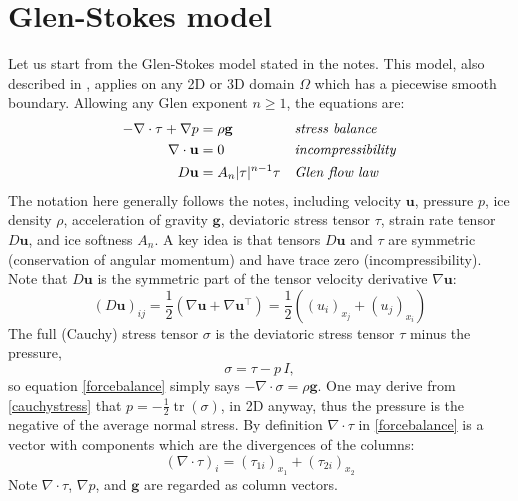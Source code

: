 \documentclass[letterpaper,final,12pt,reqno]{amsart}
\newcommand{\grad}{\nabla}
\newcommand{\Div}{\nabla\cdot}
\newcommand{\trace}{\operatorname{tr}}
\newcommand{\bg}{\mathbf{g}}
\newcommand{\bu}{\mathbf{u}}
\begin{document}
\section{Glen-Stokes model} \label{sec:stokes}

Let us start from the Glen-Stokes model stated in the notes.  This model, also described in \cite{GreveBlatter2009,JouvetRappaz2011}, applies on any 2D or 3D domain $\Omega$ which has a piecewise smooth boundary.  Allowing any Glen exponent $n\ge 1$, the equations are:
\begin{align}
- \nabla \cdot \tau + \nabla p &= \rho \bg &&\text{\emph{stress balance}} \label{forcebalance} \\
\nabla \cdot \bu &= 0 &&\text{\emph{incompressibility}} \label{incompressible} \\
D\bu &= A_n |\tau|^{n-1} \tau &&\text{\emph{Glen flow law}} \label{flowlaw}
\end{align}
The notation here generally follows the notes, including velocity $\bu$, pressure $p$, ice density $\rho$, acceleration of gravity $\bg$, deviatoric stress tensor $\tau$, strain rate tensor $D\bu$, and ice softness $A_n$.  A key idea is that tensors $D\bu$ and $\tau$ are symmetric (conservation of angular momentum) and have trace zero (incompressibility).  Note that $D\bu$ is the symmetric part of the tensor velocity derivative $\grad \bu$:
\begin{equation}
(D\bu)_{ij} = \frac{1}{2} \left(\grad\bu + \grad\bu^\top\right) = \frac{1}{2} \left((u_i)_{x_j} + (u_j)_{x_i}\right) \label{strainrate}
\end{equation}
The full (Cauchy) stress tensor $\sigma$ is the deviatoric stress tensor $\tau$ minus the pressure,
\begin{equation}
    \sigma = \tau - p\,I,  \label{cauchystress}
\end{equation}
so equation \eqref{forcebalance} simply says $-\Div \sigma = \rho \bg$.  One may derive from \eqref{cauchystress} that $p = -\frac{1}{2} \trace(\sigma)$, in 2D anyway, thus the pressure is the negative of the average normal stress.  By definition $\Div\tau$ in \eqref{forcebalance} is a vector with components which are the divergences of the columns:
\begin{equation}
    \left(\nabla \cdot \tau\right)_i = \left(\tau_{1i}\right)_{x_1} + \left(\tau_{2i}\right)_{x_2}  \label{divtaudefn}
\end{equation}
Note $\nabla\cdot \tau$, $\nabla p$, and $\bg$ are regarded as column vectors.
\end{document}
